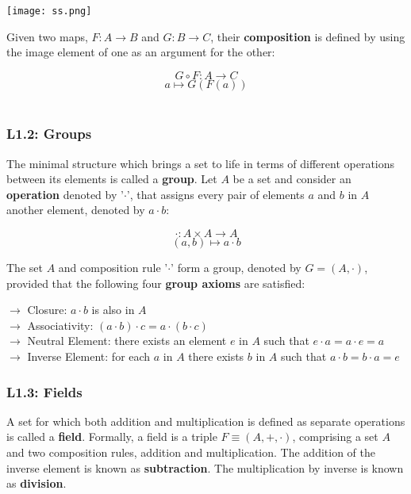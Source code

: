 \documentclass[11pt, oneside]{article}   	%
\begin{document}
\begin{center}
  \texttt{[image: ss.png]}
\end{center}

Given two maps, $F: A \rightarrow B$ and $G: B \rightarrow C$, their \textbf{composition} is defined by using the image element of one as an argument for the other: 

\[ G \circ F: A \rightarrow C\] 
\[a \mapsto G(F(a)) \] \\

\subsubsection{L1.2: Groups} 

The minimal structure which brings a set to life in terms of different operations between its elements is called a \textbf{group}. Let $A$ be a set and consider an \textbf{operation} denoted by '$\cdot$', that assigns every pair of elements $a$ and $b$ in $A$ another element, denoted by $a \cdot b$: 

\[ \cdot : A \times A \rightarrow A \]
\[(a,b) \mapsto a\cdot b\] 

The set $A$ and composition rule '$\cdot$' form a group, denoted by $G=(A, \cdot)$, provided that the following four \textbf{group axioms} are satisfied: \\

\begin{tcolorbox}[colback=red!5!white, colframe=red!50!black, title = Group Axioms]
$\rightarrow$ Closure: $a\cdot b$ is also in $A$ \\
$\rightarrow$ Associativity: $(a \cdot b) \cdot c = a \cdot (b \cdot c)$ \\
$\rightarrow$ Neutral Element: there exists an element $e$ in $A$ such that $e \cdot a = a \cdot e = a$\\
$\rightarrow$ Inverse Element: for each $a$ in $A$ there exists $b$ in $A$ such that $a \cdot b = b \cdot a = e$ \\
\end{tcolorbox}

\subsubsection{L1.3: Fields}

A set for which both addition and multiplication is defined as separate operations is called a \textbf{field}. Formally, a field is a triple $F \equiv (A, +, \cdot)$, comprising a set $A$ and two composition rules, addition and multiplication. The addition of the inverse element is known as \textbf{subtraction}. The multiplication by inverse is known as \textbf{division}. 
\end{document}
